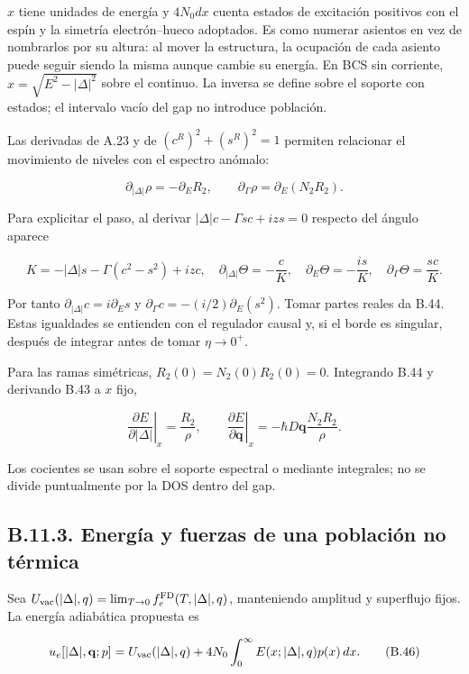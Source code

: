 \documentclass[
  spanish,
  10pt,
  a4paper,
]{article}
\begin{document}
\(x\) tiene unidades de energía y \(4N_0dx\) cuenta estados de
excitación positivos con el espín y la simetría electrón--hueco
adoptados. Es como numerar asientos en vez de nombrarlos por su altura:
al mover la estructura, la ocupación de cada asiento puede seguir siendo
la misma aunque cambie su energía. En BCS sin corriente,
\(x=\sqrt{E^2-|\Delta|^2}\) sobre el continuo. La inversa se define
sobre el soporte con estados; el intervalo vacío del gap no introduce
población.

Las derivadas de A.23 y de \((c^R)^2+(s^R)^2=1\) permiten relacionar el
movimiento de niveles con el espectro anómalo:

\[
\partial_{|\Delta|}\rho=-\partial_E R_2,
\qquad \partial_\Gamma\rho=\partial_E(N_2R_2).
\tag{B.44}
\]

Para explicitar el paso, al derivar \(|\Delta|c-\Gamma sc+izs=0\)
respecto del ángulo aparece

\[
K=-|\Delta|s-\Gamma(c^2-s^2)+izc,
\quad \partial_{|\Delta|}\Theta=-\frac{c}{K},
\quad \partial_E\Theta=-\frac{is}{K},
\quad \partial_\Gamma\Theta=\frac{sc}{K}.
\tag{B.44a}
\]

Por tanto \(\partial_{|\Delta|}c=i\partial_Es\) y
\(\partial_\Gamma c=-(i/2)\partial_E(s^2)\). Tomar partes reales da
B.44. Estas igualdades se entienden con el regulador causal y, si el
borde es singular, después de integrar antes de tomar \(\eta\to0^+\).

Para las ramas simétricas, \(R_2(0)=N_2(0)R_2(0)=0\). Integrando B.44 y
derivando B.43 a \(x\) fijo,

\[
\left.\frac{\partial E}{\partial|\Delta|}\right|_x=\frac{R_2}{\rho},
\qquad
\left.\frac{\partial E}{\partial\mathbf q}\right|_x
=-\hbar D\mathbf q\frac{N_2R_2}{\rho}.
\tag{B.45}
\]

Los cocientes se usan sobre el soporte espectral o mediante integrales;
no se divide puntualmente por la DOS dentro del gap.

\subsection{B.11.3. Energía y fuerzas de una población no
térmica}\label{b.11.3.-energuxeda-y-fuerzas-de-una-poblaciuxf3n-no-tuxe9rmica}

Sea \(U_{\rm vac}(|\Delta|,q)=\lim_{T\to0}f_e^{\rm FD}(T,|\Delta|,q)\),
manteniendo amplitud y superflujo fijos. La energía adiabática propuesta
es

\[
u_e[|\Delta|,\mathbf q;p]
=U_{\rm vac}(|\Delta|,q)
+4N_0\int_0^\infty E(x;|\Delta|,q)p(x)\,dx.
\tag{B.46}
\]
\end{document}
